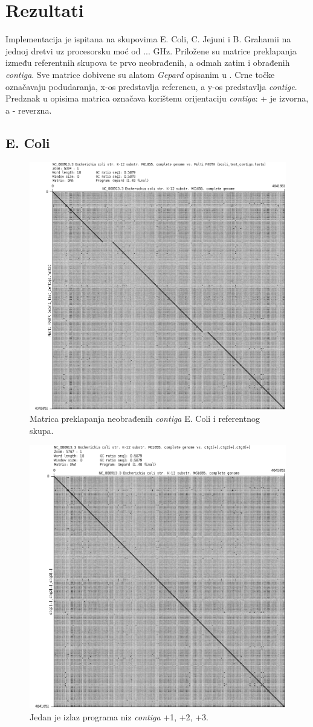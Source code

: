 \documentclass[times, utf8, seminar, numeric]{fer}
\begin{document}
\chapter{Rezultati}
Implementacija je ispitana na skupovima E. Coli, C. Jejuni i B. Grahamii na jednoj dretvi uz procesorsku moć od ... GHz. Priložene su matrice preklapanja između referentnih skupova te prvo neobrađenih, a odmah zatim i obrađenih \textit{contiga}. Sve matrice dobivene su alatom \textit{Gepard} opisanim u \cite{gepard}. Crne točke označavaju podudaranja, x-os predstavlja referencu, a y-os predstavlja \textit{contige}. Predznak u opisima matrica označava korištenu orijentaciju \textit{contiga}: + je izvorna, a - reverzna.

\section{E. Coli}
\begin{figure}[h]
	\centering
	\includegraphics[width=0.7\linewidth]{img/ec_contigs}
	\caption{Matrica preklapanja neobrađenih \textit{contiga} E. Coli i referentnog skupa.}
	\label{fig:eccontigs}
\end{figure}

\begin{figure}[h]
	\centering
	\includegraphics[width=0.7\linewidth]{img/ec_1_2_3}
	\caption{Jedan je izlaz programa niz \textit{contiga} +1, +2, +3.}
	\label{fig:ec123}
\end{figure}
\end{document}
